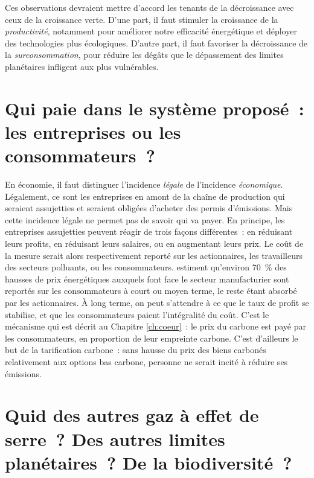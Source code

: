 \documentclass[a5paper,french,openany]{memoir}
\begin{document}
Ces observations devraient mettre d'accord les tenants de la décroissance avec ceux de la croissance verte. D'une part, il faut stimuler la croissance de la \textit{productivité}, notamment pour améliorer notre efficacité énergétique et déployer des technologies plus écologiques. D'autre part, il faut favoriser la décroissance de la \textit{surconsommation}, pour réduire les dégâts que le dépassement des limites planétaires infligent aux plus vulnérables. 

\section*{\normalsize Qui paie dans le système proposé~: les entreprises ou les consommateurs~?}\label{q:incidence}

En économie, il faut distinguer l'incidence \textit{légale} de l'incidence \textit{économique}. Légalement, ce sont les entreprises en amont de la chaîne de production qui seraient assujetties et seraient obligées d'acheter des permis d'émissions. Mais cette incidence légale ne permet pas de savoir qui va payer. En principe, les entreprises assujetties peuvent réagir de trois façons différentes~: en réduisant leurs profits, en réduisant leurs salaires, ou en augmentant leurs prix. Le coût de la mesure serait alors respectivement reporté sur les actionnaires, les travailleurs des secteurs polluants, ou les consommateurs. \cite{ganapati_energy_2020} estiment qu'environ 70~\% des hausses de prix énergétiques auxquels font face le secteur manufacturier sont reportés sur les consommateurs à court ou moyen terme, le reste étant absorbé par les actionnaires. À long terme, on peut s'attendre à ce que le taux de profit se stabilise, et que les consommateurs paient l'intégralité du coût. C'est le mécanisme qui est décrit au Chapitre \ref{ch:coeur}~: le prix du carbone est payé par les consommateurs, en proportion de leur empreinte carbone. C'est d'ailleurs le but de la tarification carbone~: sans hausse du prix des biens carbonés relativement aux options bas carbone, personne ne serait incité à réduire ses émissions.

\section*{\normalsize Quid des autres gaz à effet de serre~? Des autres limites planétaires~? De la biodiversité~?}\label{q:scope}
\end{document}
